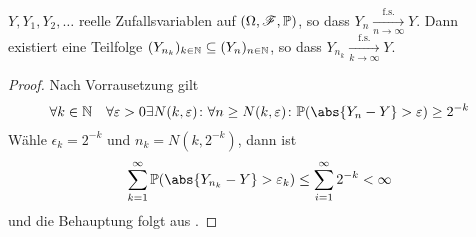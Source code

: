 \begin{conclusion}
	$Y,Y_1,Y_2, \dots$ reelle Zufallsvariablen auf $(\Omega,\mathscr F,\mathbb{P})$, so dass $Y_n \xrightarrow[n \to \infty]{\text{f.s.}}Y$. Dann existiert eine Teilfolge $(Y_{n_k})_{k \in \mathbb{N}} \subseteq (Y_n)_{n\in \mathbb{N}}$, so dass $Y_{n_k} \xrightarrow[k \to \infty]{\text{f.s.}} Y$.
\end{conclusion}
\begin{proof}
	Nach Vorrausetzung gilt
	\begin{align*}
		\forall k \in \N \quad \forall \epsilon > 0 \exists N(k,\epsilon)\colon \forall n \ge N(k,\epsilon)\colon \P(\abs{Y_n - Y}>\epsilon)\ge 2^{-k}
	\end{align*}
	Wähle $\epsilon_k = 2^{-k}$ und $n_k = N(k,2^{-k})$, dann ist
	\begin{align*}
		\sum_{k=1}^{\infty} \P(\abs{Y_{n_k} - Y} > \epsilon_k) \le \sum_{i=1}^{\infty} 2^{-k} < \infty
	\end{align*}
	und die Behauptung folgt aus .
\end{proof}